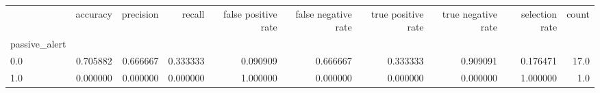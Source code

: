 \begin{tabular}{lrrrrrrrrr}
\toprule
{} &  accuracy &  precision &    recall &  false positive rate &  false negative rate &  true positive rate &  true negative rate &  selection rate &  count \\
passive\_alert &           &            &           &                      &                      &                     &                     &                 &        \\
\midrule
0.0           &  0.705882 &   0.666667 &  0.333333 &             0.090909 &             0.666667 &            0.333333 &            0.909091 &        0.176471 &   17.0 \\
1.0           &  0.000000 &   0.000000 &  0.000000 &             1.000000 &             0.000000 &            0.000000 &            0.000000 &        1.000000 &    1.0 \\
\bottomrule
\end{tabular}
